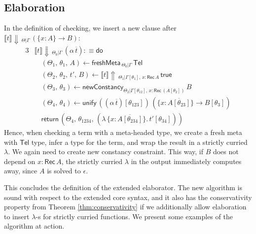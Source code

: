 \documentclass[acmsmall,review,anonymous,prologue,dvipsnames]{acmart}\settopmatter{printfolios=true,printccs=false,printacmref=false}
\newcommand{\freshMeta}[3]{\mathsf{freshMeta}\,_{#1|#2}\,#3}
\newcommand{\newConstancy}[5]{\mathsf{newConstancy}_{#1|#2,\,#3 : \Rec\,#4}\,#5}
\newcommand{\unify}{\mathsf{unify}}
\newcommand{\echeck}[4]{\llbracket#1\rrbracket\!\Downarrow\,_{#2|#3}\,#4}
\newcommand{\einfer}[4]{\llbracket#1\rrbracket\!\Uparrow\,_{#3|#4}\,#2}
\newcommand{\edo}{\boldsymbol{\mathsf{do}}}
\newcommand{\ereturn}{\boldsymbol{\mathsf{return}}}
\newcommand{\true}{\mathsf{true}}
\newcommand{\Tel}{\mathsf{Tel}}
\newcommand{\Rec}{\mathsf{Rec}}
\newcommand{\ol}[1]{\overline{#1}}
\theoremstyle{remark}
\begin{document}
\subsection{Elaboration}

In the definition of checking, we insert a new clause after
$\echeck{t}{\Theta}{\Gamma}{(\{x : A\}\to B)}$:
\begin{alignat*}{3}
& \echeck{t}{\Theta_0}{\Gamma}{(\alpha\,\ol{t})} :\equiv \edo\\
& \quad (\Theta_1,\,\theta_1,\,A) \leftarrow \freshMeta{\Theta_0}{\Gamma}{\Tel}\\
& \quad (\Theta_2,\,\theta_2,\,t',\,B) \leftarrow \einfer{t}{\true}{\Theta_1}{\Gamma[\theta_1],\,x:\Rec\,A}\\
& \quad (\Theta_3,\,\theta_3) \leftarrow \newConstancy{\Theta_2}{\Gamma[\theta_{12}]}{x}{(A[\theta_2])}{B}\\
& \quad (\Theta_4,\,\theta_4) \leftarrow
            \unify\, ((\alpha\,\ol{t})[\theta_{123}])\,(\{x : \ol{A[\theta_{23}]}\} \to B[\theta_3])\\
& \quad \ereturn\,(\Theta_4,\,\theta_{1234},\,(\lambda\,\{x : \ol{A[\theta_{234}]}\}.\,t'[\theta_{34}]))
\end{alignat*}
Hence, when checking a term with a meta-headed type, we create a fresh meta with
$\Tel$ type, infer a type for the term, and wrap the result in a strictly
curried $\lambda$. We again need to create new constancy constraint. This way,
if $B$ does not depend on $x : \Rec\,A$, the strictly curried $\lambda$ in the
output immediately computes away, since $A$ is solved to $\epsilon$.

This concludes the definition of the extended elaborator. The new algorithm is
sound with respect to the extended core syntax, and it also has the
conservativity property from Theorem \ref{thm:conservativity} if we additionally
allow elaboration to insert $\lambda$-s for strictly curried functions. We present
some examples of the algorithm at action.
\end{document}
